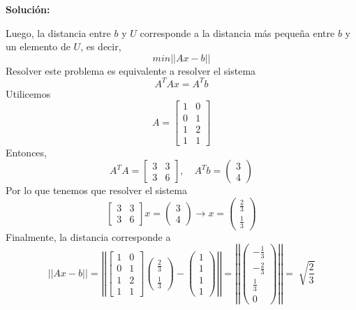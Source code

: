 \documentclass[12pt]{article}
\newenvironment{solucion}
{\begin{mdframed}[backgroundcolor=black!10]
		{\bf Solución:}\\
	}
	{
	\end{mdframed}
}
\newenvironment{preguntas}
{\begin{enumerate}\itemsep12pt
	}
	{
	\end{enumerate}
}
\newcommand{\ra}{\rightarrow}
\begin{document}
\begin{preguntas}
\begin{solucion}
\begin{enumerate}[a)]
			Luego, la distancia entre $b$ y $U$ corresponde a la distancia más pequeña entre $b$ y un elemento de $U$, es decir,
			$$min||Ax-b||$$
			Resolver este problema es equivalente a resolver el sistema
			$$A^TAx = A^Tb$$
			Utilicemos
			$$A = \begin{bmatrix}
			1 & 0 \\
			0 & 1 \\
			1 & 2 \\
			1 & 1
			\end{bmatrix}$$
			Entonces,
			$$A^TA = \begin{bmatrix}
			3 & 3 \\
			3 & 6
			\end{bmatrix}, \quad A^Tb = \begin{pmatrix}
			3 \\ 4
			\end{pmatrix}$$
			Por lo que tenemos que resolver el sistema
			$$\begin{bmatrix}
			3 & 3 \\
			3 & 6
			\end{bmatrix}x = \begin{pmatrix}
			3 \\ 4
			\end{pmatrix} \ra x = \begin{pmatrix}
			\frac{2}{3}\\ \frac{1}{3}
			\end{pmatrix}$$
			Finalmente, la distancia corresponde a
			$$||Ax-b|| = \left|\left|\begin{bmatrix}
			1 & 0 \\
			0 & 1 \\
			1 & 2 \\
			1 & 1
			\end{bmatrix}\begin{pmatrix}
			\frac{2}{3}\\ \frac{1}{3}
			\end{pmatrix} - \begin{pmatrix}1\\1\\1\\1\end{pmatrix}\right|\right|
			= \left|\left|\begin{pmatrix}
			-\frac{1}{3}\\
			-\frac{2}{3}\\
			\frac{1}{3}\\
			0
			\end{pmatrix}\right|\right| = \sqrt[]{\dfrac{2}{3}}$$

\end{enumerate}
\end{solucion}
\end{preguntas}
\end{document}
